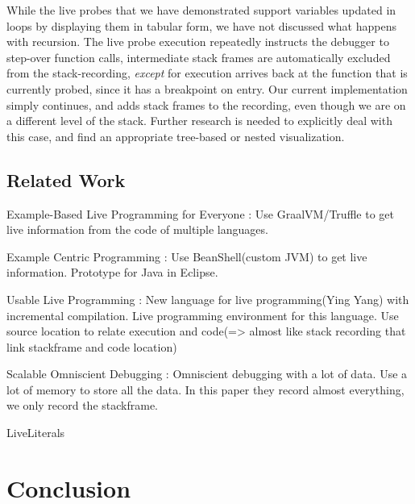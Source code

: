\documentclass[english,submission]{programming}
\begin{document}
While the live probes that we have demonstrated support variables updated in loops by displaying them in tabular form, we have not discussed what happens with recursion. The live probe execution repeatedly instructs the debugger to step-over function calls, intermediate stack frames are automatically excluded from the stack-recording, \textit{except} for execution arrives back at the function that is currently probed, since it has a breakpoint on entry. Our current implementation simply continues, and adds stack frames to the recording, even though we are on a different level of the stack. Further research is needed to explicitly deal with this case, and find an appropriate tree-based or nested visualization.

\subsection{Related Work}

Example-Based Live Programming for Everyone\cite{ExampleBasedGraalVM} : Use GraalVM/Truffle to get live information from the code of multiple languages.

Example Centric Programming\cite{ExampleCentric} : Use BeanShell(custom JVM) to get live information. Prototype for Java in Eclipse.

Usable Live Programming\cite{UsableLiveProgramming} : New language for live programming(Ying Yang) with incremental compilation. Live programming environment for this language.
Use source location to relate execution and code(=> almost like stack recording that link stackframe and code location)

Scalable Omniscient Debugging\cite{ScalableOmniscient} : Omniscient debugging with a lot of data. Use a lot of memory to store all the data.
In this paper they record almost everything, we only record the stackframe.

LiveLiterals~\cite{LiveLiterals}

\section{Conclusion}
\label{sec:conclusion}

\printbibliography
\end{document}
